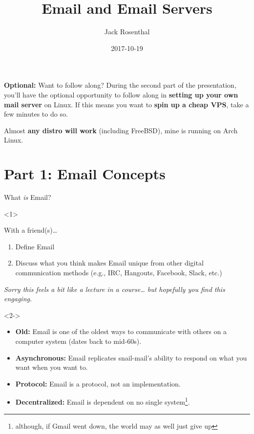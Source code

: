 \documentclass{lug}
\title{Email and Email Servers}
\author{Jack Rosenthal}
\date{2017-10-19}
\institute{Mines Linux Users Group}
\begin{document}
\begin{frame}{\textbf{Optional:} Want to follow along?}
    During the second part of the presentation, you'll have the optional
    opportunity to follow along in \textbf{setting up your own mail server} on
    Linux. If this means you want to \textbf{spin up a cheap VPS}, take a few
    minutes to do so.

    Almost \textbf{any distro will work} (including FreeBSD), mine is running
    on Arch Linux.
\end{frame}

\section{Part 1: Email Concepts}

\begin{frame}{What \emph{is} Email?}
    \begin{onlyenv}<1>
        \begin{block}{With a friend(s)\dots}
            \begin{enumerate}
                \item Define Email
                \item Discuss what you think makes Email unique from other
                    digital communication methods (e.g., IRC, Hangouts,
                    Facebook, Slack, etc.)
            \end{enumerate}
        \end{block}
        {\small\itshape Sorry this feels a bit like a lecture in a
                        course\dots{} but hopefully you find this
                        engaging.}
    \end{onlyenv}
    \begin{onlyenv}<2->
        \begin{itemize}
            \item<2-> \textbf{Old:} Email is one of the oldest ways to
                communicate with others on a computer system (dates back to
                mid-60s).
            \item<3-> \textbf{Asynchronous:} Email replicates snail-mail's ability
                to respond on what you want when you want to.
            \item<4-> \textbf{Protocol:} Email is a protocol, not an
                implementation.
            \item<5-> \textbf{Decentralized:} Email is dependent on no single
                system\footnote{although, if Gmail went down, the world may as
                well just give up}.
        \end{itemize}
    \end{onlyenv}
\end{frame}
\end{document}
